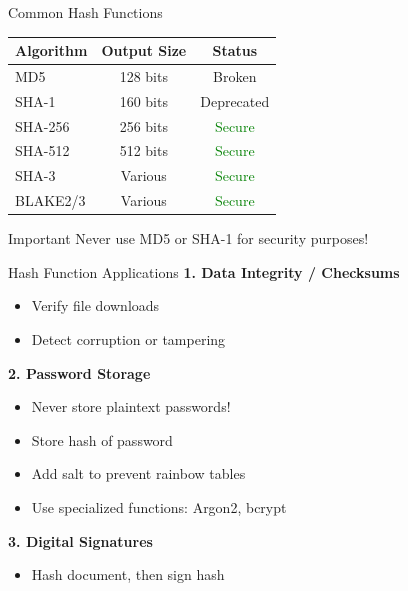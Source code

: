 \documentclass{beamer}
\begin{document}
\begin{frame}{Common Hash Functions}
\begin{center}
\begin{tabular}{|l|c|c|}
\hline
\textbf{Algorithm} & \textbf{Output Size} & \textbf{Status} \\
\hline
MD5 & 128 bits & \alert{Broken} \\
SHA-1 & 160 bits & \alert{Deprecated} \\
SHA-256 & 256 bits & \textcolor{green}{Secure} \\
SHA-512 & 512 bits & \textcolor{green}{Secure} \\
SHA-3 & Various & \textcolor{green}{Secure} \\
BLAKE2/3 & Various & \textcolor{green}{Secure} \\
\hline
\end{tabular}
\end{center}

\vspace{0.3cm}
\begin{alertblock}{Important}
Never use MD5 or SHA-1 for security purposes!
\end{alertblock}
\end{frame}

\begin{frame}{Hash Function Applications}
\textbf{1. Data Integrity / Checksums}
\begin{itemize}
    \item Verify file downloads
    \item Detect corruption or tampering
\end{itemize}

\vspace{0.3cm}
\textbf{2. Password Storage}
\begin{itemize}
    \item Never store plaintext passwords!
    \item Store hash of password
    \item Add salt to prevent rainbow tables
    \item Use specialized functions: Argon2, bcrypt
\end{itemize}

\vspace{0.3cm}
\textbf{3. Digital Signatures}
\begin{itemize}
    \item Hash document, then sign hash
\end{itemize}

\end{frame}
\end{document}
